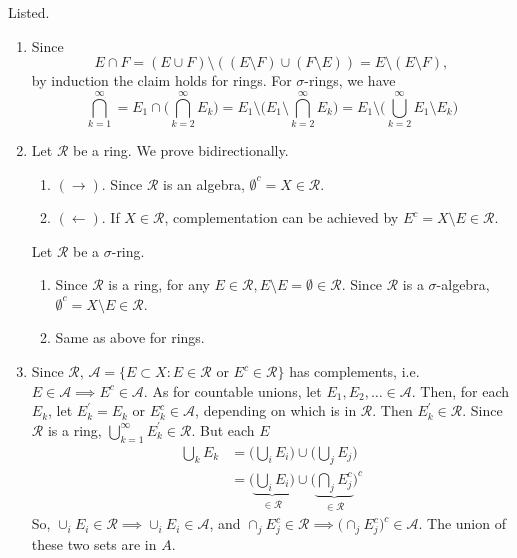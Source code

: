 	\begin{solution}
		Listed. 
		\begin{enumerate}
		  \item Since 
				\begin{equation}
					E \cap F = (E \cup F) \setminus ((E \setminus F) \cup (F \setminus E)) = E \setminus (E \setminus F), 
				\end{equation}
				by induction the claim holds for rings. For $\sigma$-rings, we have 
				\begin{equation}
					\bigcap_{k=1}^\infty = E_1 \cap \bigg( \bigcap_{k=2}^\infty E_k \bigg) = E_1 \setminus \bigg( E_1 \setminus \bigcap_{k=2}^\infty E_k \bigg) = E_1 \setminus \bigg( \bigcup_{k=2}^\infty E_1 \setminus E_k \bigg)
				\end{equation}

			\item Let $\mathcal{R}$ be a ring. We prove bidirectionally. 
				\begin{enumerate}
					\item $(\rightarrow)$. Since $\mathcal{R}$ is an algebra, $\emptyset^c = X \in \mathcal{R}$. 
					\item $(\leftarrow)$. If $X \in \mathcal{R}$, complementation can be achieved by $E^c = X \setminus E \in \mathcal{R}$. 
				\end{enumerate}

				Let $\mathcal{R}$ be a $\sigma$-ring. 
				\begin{enumerate}
					\item Since $\mathcal{R}$ is a ring, for any $E \in \mathcal{R}, E \setminus E = \emptyset \in \mathcal{R}$. Since $\mathcal{R}$ is a $\sigma$-algebra, $\emptyset^c = X \setminus E \in \mathcal{R}$. 
					\item Same as above for rings. 
				\end{enumerate}

			\item Since $\mathcal{R}$, $\mathcal{A} = \{E \subset X \colon E \in \mathcal{R} \text{ or } E^c \in \mathcal{R} \}$ has complements, i.e. $E \in \mathcal{A} \implies E^c \in \mathcal{A}$. As for countable unions, let $E_1, E_2, \ldots \in \mathcal{A}$. Then, for each $E_k$, let $E_k^\prime = E_k$ or $E_k^c \in \mathcal{A}$, depending on which is in $\mathcal{R}$. Then $E_k^\prime \in \mathcal{R}$. Since $\mathcal{R}$ is a ring, $\bigcup_{k=1}^\infty E_k^\prime \in \mathcal{R}$. But each $E$ 
				\begin{align}
					\bigcup_k E_k & = \bigg( \bigcup_i E_i \bigg) \cup \bigg( \bigcup_j E_j \bigg) \\ 
												& = \bigg( \underbrace{\bigcup_i E_i}_{\in \mathcal{R}} \bigg) \cup \bigg( \underbrace{\bigcap_j E_j^c}_{\in \mathcal{R}} \bigg)^c
				\end{align}
				So, $\cup_i E_i \in \mathcal{R} \implies \cup_i E_i \in \mathcal{A}$, and $\cap_j E_j^c \in \mathcal{R} \implies \big( \cap_j E_j^c \big)^c \in \mathcal{A}$. The union of these two sets are in $A$. 


\end{enumerate}
\end{solution}

